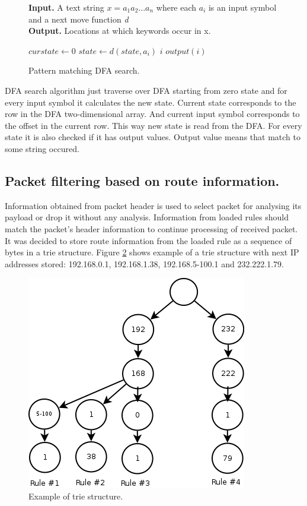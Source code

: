 \documentclass[thesis=M,english]{FITthesis}[2011/07/15]
\begin{document}
\begin{figure}[h]
\textbf{Input.} A text string $x = a_1 a_2 ... a_n$ where each $a_i$ is an input symbol and a next move function \emph{d} \\
\textbf{Output.} Locations at which keywords occur in x.\\
\begin{algorithmic}
\STATE $curstate \leftarrow$0
\STATE $state \leftarrow d(state, a_i)$
\PRINT $i$
\PRINT $output(i)$
\ENDIF
\ENDFOR
\end{algorithmic}
\caption{Pattern matching DFA search.}
\label{fig:dfa_search}
\end{figure}

DFA search algorithm just traverse over DFA starting from zero state and for every input symbol it calculates the new state. Current state corresponds to the row in the DFA two-dimensional array. And current input symbol corresponds to the offset in the current row. This way new state is read from the DFA. For every state it is also checked if it has output values. Output value means that match to some string occured.

\subsection*{Packet filtering based on route information.}
Information obtained from packet header is used to select packet for analysing its payload or drop it without any analysis. Information from loaded rules should match the packet's header information to continue processing of received packet. It was decided to store route information from the loaded rule as a sequence of bytes in a trie structure. Figure \ref{fig:trie_example} shows example of a trie structure with next IP addresses stored: 192.168.0.1, 192.168.1.38, 192.168.5-100.1 and 232.222.1.79. 

\begin{figure}[h]
\centering
\includegraphics[scale=0.5]{images/trie.png}
\caption{Example of trie structure.}
\label{fig:trie_example}
\end{figure}
\end{document}
